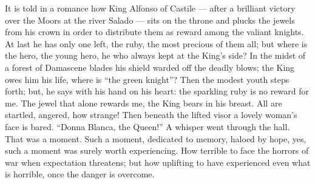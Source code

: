 \documentclass[12pt,a4paper,openany]{book}
\begin{document}
It is told in a romance how King Alfonso of Castile --- after a brilliant victory over the Moors at
the river Salado --- sits on the throne and plucks the jewels from his crown in order to distribute
them as reward among the valiant knights. At last he has only one left, the ruby, the most precious
of them all; but where is the hero, the young hero, he who always kept at the King's side? In the
midst of a forest of Damascene blades his shield warded off the deadly blows; the King owes him his
life, where is ``the green knight''? Then the modest youth steps forth; but, he says with his hand
on his heart: the sparkling ruby is no reward for me. The jewel that alone rewards me, the King bears
in his breast. All are startled, angered, how strange! Then beneath the lifted visor a lovely
woman's face is bared. ``Donna Blanca, the Queen!'' A whisper went through the hall. That was a
moment. Such a moment, dedicated to memory, haloed by hope, yes, such a moment was surely worth
experiencing. How terrible to face the horrors of war when expectation threatens; but how uplifting
to have experienced even what is horrible, once the danger is overcome.
\end{document}
